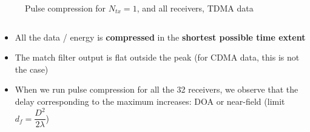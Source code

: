 \documentclass[UKenglish,8pt,aspectratio=1610]{beamer}
\begin{document}
\begin{frame}
\begin{columns}
\begin{column}{0.5\textwidth}
\begin{figure}[h!]
		\centering
		\caption{Pulse compression for $N_{tx}=1$, and all receivers, TDMA data}
	\end{figure}
\end{column}
\end{columns}
\begin{itemize}
	\item All the data / energy is \textbf{compressed} in the \textbf{shortest possible time extent}
	\item The match filter output is flat outside the peak (for CDMA data, this is not the case)
	\item When we run pulse compression for all the 32 receivers, we observe that the delay corresponding to the maximum increases: DOA or near-field (limit $d_{f}=\dfrac{D^2}{2\lambda}$)
\end{itemize}
\end{frame}
\end{document}
